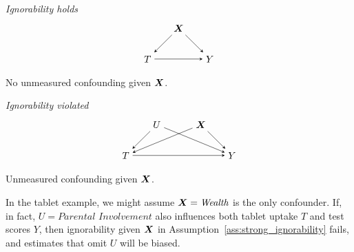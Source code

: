 \documentclass[11pt]{exam}
\begin{document}
\begin{center}
\begin{minipage}{0.47\linewidth}
\centering
\textit{Ignorability holds}
\[
\begin{tikzpicture}[>=stealth, node distance=1.6cm]
  \node (X) {$\bX$};
  \node[below right of=X] (Y) {$Y$};
  \node[below left of=X] (T) {$T$};
  \draw[->] (X) -- (T);
  \draw[->] (X) -- (Y);
  \draw[->] (T) -- (Y);
\end{tikzpicture}
\]
No unmeasured confounding given $\bm{X}$.
\end{minipage}\hfill
\begin{minipage}{0.47\linewidth}
\centering
\textit{Ignorability violated}
\[
\begin{tikzpicture}[>=stealth, node distance=1.6cm]
  \node (X) {$\bX$};
  \node[left of=X] (U) {$U$};
  \node[below right of=X] (Y) {$Y$};
  \node[below left of=U] (T) {$T$};
  \draw[->] (X) -- (T);
  \draw[->] (X) -- (Y);
  \draw[->] (U) -- (T);
  \draw[->] (U) -- (Y);
  \draw[->] (T) -- (Y);
\end{tikzpicture}
\]
Unmeasured confounding given $\bm{X}$.
\end{minipage}
\end{center}

In the tablet example, we might assume $\bm{X}=\textit{Wealth}$ is the only confounder. If, in fact, $U=\textit{Parental Involvement}$ also influences both tablet uptake $T$ and test scores $Y$, then ignorability given $\bm{X}$ in Assumption~\ref{ass:strong_ignorability} fails, and estimates that omit $U$ will be biased.
\end{document}

